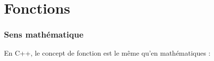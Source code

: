 \section{Fonctions}

\begin{frame}
	\frametitle{Sens mathématique}

    En C++, le concept de fonction est le même qu'en mathématiques :
    \begin{center}

\end{center}
\end{frame}
